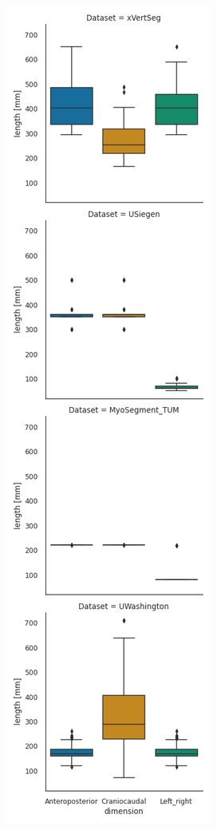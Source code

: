 \begin{figure}
    \centering
    \begin{minipage}{.45\textwidth}
        \includegraphics[width=.98\textwidth]{automated_graphs/AllDataset_DimensionsBoxplot.png}

\end{minipage}
\end{figure}
